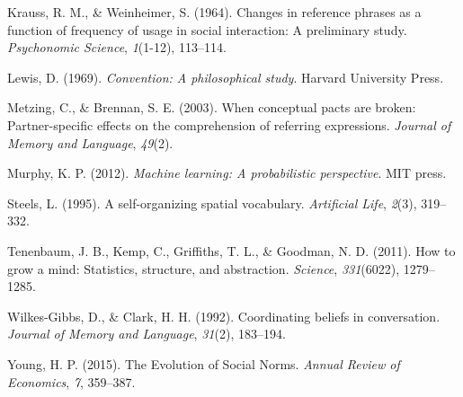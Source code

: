 \documentclass[10pt, letterpaper]{article}
\begin{document}
\leavevmode\hypertarget{ref-krauss_changes_1964}{}%
Krauss, R. M., \& Weinheimer, S. (1964). Changes in reference phrases as
a function of frequency of usage in social interaction: A preliminary
study. \emph{Psychonomic Science}, \emph{1}(1-12), 113--114.

\leavevmode\hypertarget{ref-lewis_convention:_1969}{}%
Lewis, D. (1969). \emph{Convention: A philosophical study}. Harvard
University Press.

\leavevmode\hypertarget{ref-metzing_when_2003}{}%
Metzing, C., \& Brennan, S. E. (2003). When conceptual pacts are broken:
Partner-specific effects on the comprehension of referring expressions.
\emph{Journal of Memory and Language}, \emph{49}(2).

\leavevmode\hypertarget{ref-murphy2012machine}{}%
Murphy, K. P. (2012). \emph{Machine learning: A probabilistic
perspective}. MIT press.

\leavevmode\hypertarget{ref-steels_self-organizing_1995}{}%
Steels, L. (1995). A self-organizing spatial vocabulary.
\emph{Artificial Life}, \emph{2}(3), 319--332.

\leavevmode\hypertarget{ref-tenenbaum_how_2011}{}%
Tenenbaum, J. B., Kemp, C., Griffiths, T. L., \& Goodman, N. D. (2011).
How to grow a mind: Statistics, structure, and abstraction.
\emph{Science}, \emph{331}(6022), 1279--1285.

\leavevmode\hypertarget{ref-wilkes-gibbs_coordinating_1992}{}%
Wilkes-Gibbs, D., \& Clark, H. H. (1992). Coordinating beliefs in
conversation. \emph{Journal of Memory and Language}, \emph{31}(2),
183--194.

\leavevmode\hypertarget{ref-young_evolution_2015}{}%
Young, H. P. (2015). The Evolution of Social Norms. \emph{Annual Review
of Economics}, \emph{7}, 359--387.


\end{document}
